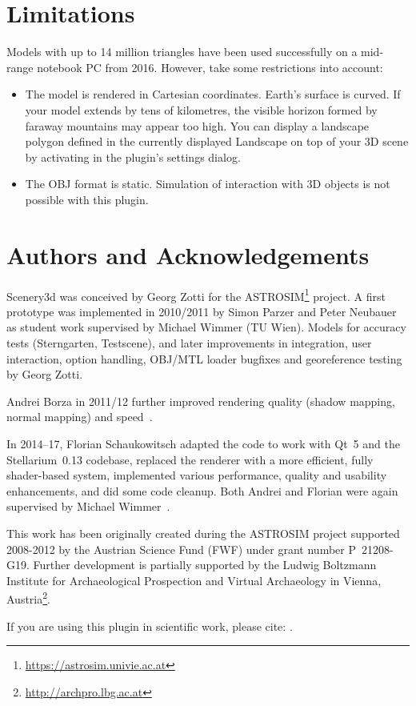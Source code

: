 \section{Limitations}
\label{sec:scenery3d:Limitations}

Models with up to 14 million triangles have been used successfully on
a mid-range notebook PC from 2016. However, take some restrictions
into account:

\begin{itemize}
\item The model is rendered in Cartesian coordinates. Earth's surface
  is curved. If your model extends by tens of kilometres, the visible
  horizon formed by faraway mountains may appear too high. You can
   display a landscape polygon defined in the
  currently displayed Landscape on top of your 3D scene by activating
   in the plugin's
  settings dialog.
\item
  The OBJ format is static. Simulation of interaction with 3D objects
  is not possible with this plugin.
\end{itemize}

\section*{Authors and Acknowledgements}
\label{sec:scenery3d:Acknowledgments}


Scenery3d was conceived by Georg Zotti for the
ASTROSIM\footnote{\url{https://astrosim.univie.ac.at}} project. A first
prototype was implemented in 2010/2011 by Simon Parzer and
Peter Neubauer as student work supervised by Michael Wimmer (TU Wien).
Models for accuracy tests (Sterngarten, Testscene), and later
improvements in integration, user interaction,  option handling,
OBJ/MTL loader bugfixes and georeference testing by Georg Zotti.

Andrei Borza in 2011/12 further improved rendering quality (shadow
mapping, normal mapping) and
speed~\citep{Zotti-Neubauer:VSMM2012,Zotti-Neubauer:EuroMed2012,Zotti:2012:SpringerAA}.

In 2014--17,
Florian Schaukowitsch adapted the code to work with Qt~5 and the 
Stellarium~0.13 codebase, replaced the renderer with a more efficient, fully
shader-based system, implemented various performance, quality and usability
enhancements, and did some code cleanup. Both Andrei and Florian were again
supervised by Michael Wimmer~\citep{Zotti:CHNT2015,Zotti:SEAC2015,Zotti:SEAC2017}.

This work has been originally created during the ASTROSIM project supported 2008-2012 by
the Austrian Science Fund (FWF) under grant number P~21208-G19. Further development is
partially supported by the Ludwig Boltzmann Institute for Archaeological Prospection and Virtual Archaeology in Vienna, Austria\footnote{%
  \url{http://archpro.lbg.ac.at}}.

If you are using this plugin in scientific work, please cite: \citep{Zotti:CHNT2015,Zotti:SEAC2015,Zotti:SEAC2017,Zotti-etal:SIA2016,Zotti:TAG2016}.



